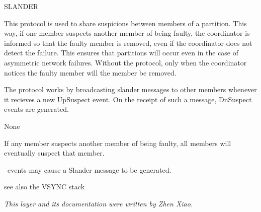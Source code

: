 %
%
%
\begin{Layer}{SLANDER}

This protocol is used to share suspicions between members of a partition.  This
way, if one member suspects another member of being faulty, the coordinator is
informed so that the faulty member is removed, even if the coordinator does not
detect the failure.  This ensures that partitions will occur even in the case
of asymmetric network failures.  Without the protocol, only when the
coordinator notices the faulty member will the member be removed.

\begin{Protocol}
The protocol works by broadcasting slander messages to other members whenever
it recieves a new UpSuspect event.  On the receipt of such a message, DnSuspect
events are generated.
\end{Protocol}

\begin{Parameters}
\item None
\end{Parameters} 

\begin{Properties}
\item
If any member suspects another member of being faulty, all members will
eventually suspect that member.
\item
\UpSuspect\ events may cause a Slander message to be generated.
\end{Properties}

\begin{Sources}
\end{Sources}

\begin{GenEvent}
\genevent{\DnSuspect}
\end{GenEvent}

\begin{Testing}
\item
see also the VSYNC stack
\end{Testing}

\emph{This layer and its documentation were written by Zhen Xiao.}
\end{Layer}
